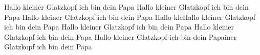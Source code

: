 \documentclass{article}
\begin{document}
\begin{abstract}
    Hallo kleiner Glatzkopf ich bin dein Papa
\end{abstract}
Hallo kleiner Glatzkopf ich bin dein Papa Hallo kleiner Glatzkopf ich bin dein Papa 
Hallo kleiner Glatzkopf ich bin dein Papa Hallo kleHallo kleiner Glatzkopf ich bin dein Papa Hallo kleiner Glatzkopf ich bin dein Papa 
Hallo kleiner Glatzkopf ich bin dein Papa Hallo kleiner Glatzkopf ich bin dein Papainer Glatzkopf ich bin dein Papa
\lipsum
\end{document}
